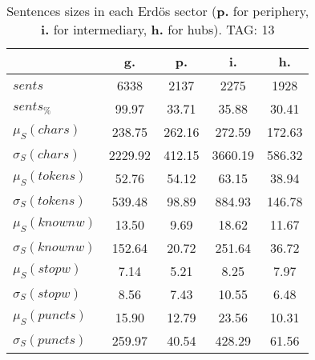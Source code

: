 \begin{table}[h!]
\begin{center}
\begin{tabular}{| l || c | c | c | c |}\hline
 & {\bf g.} & {\bf p.} & {\bf i.} & {\bf h.} \\\hline\hline
$sents$ & 6338  & 2137  & 2275  & 1928 \\
$sents_{\%}$ & 99.97  & 33.71  & 35.88  & 30.41 \\\hline
$\mu_S(chars)$ & 238.75  & 262.16  & 272.59  & 172.63 \\
$\sigma_S(chars)$ & 2229.92  & 412.15  & 3660.19  & 586.32 \\\hline
$\mu_S(tokens)$ & 52.76  & 54.12  & 63.15  & 38.94 \\
$\sigma_S(tokens)$ & 539.48  & 98.89  & 884.93  & 146.78 \\\hline
$\mu_S(knownw)$ & 13.50  & 9.69  & 18.62  & 11.67 \\
$\sigma_S(knownw)$ & 152.64  & 20.72  & 251.64  & 36.72 \\\hline
$\mu_S(stopw)$ & 7.14  & 5.21  & 8.25  & 7.97 \\
$\sigma_S(stopw)$ & 8.56  & 7.43  & 10.55  & 6.48 \\\hline
$\mu_S(puncts)$ & 15.90  & 12.79  & 23.56  & 10.31 \\
$\sigma_S(puncts)$ & 259.97  & 40.54  & 428.29  & 61.56 \\\hline
\end{tabular}
\caption{Sentences sizes in each Erd\"os sector ({{\bf p.}} for periphery, {{\bf i.}} for intermediary, {{\bf h.}} for hubs). TAG: 13}
\end{center}
\end{table}